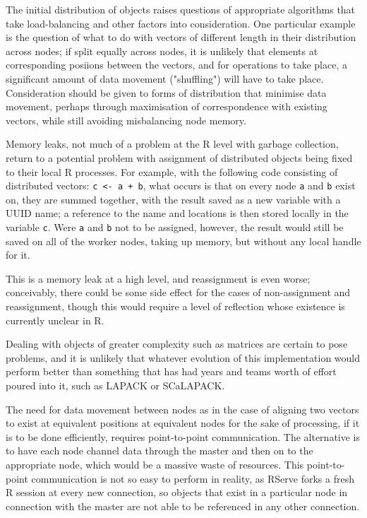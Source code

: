\documentclass[a4paper,10pt]{article}
\begin{document}
The initial distribution of objects raises questions of appropriate algorithms
that take load-balancing and other factors into consideration.
One particular example is the question of what to do with vectors of different
length in their distribution across nodes;
if split equally across nodes, it is unlikely that elements at corresponding
posiions between the vectors, and for operations to take place, a significant
amount of data movement ("shuffling") will have to take place.
Consideration should be given to forms of distribution that minimise data
movement, perhaps through maximisation of correspondence with existing vectors,
while still avoiding misbalancing node memory.

Memory leaks, not much of a problem at the R level with garbage collection,
return to a potential problem with assignment of distributed objects being
fixed to their local R processes.
For example, with the following code consisting of distributed vectors: \texttt{c <- a
+ b}, what occurs is that on every node \texttt{a} and \texttt{b} exist on, they are summed
together, with the result saved as a new variable with a UUID name; a reference
to the name and locations is then stored locally in the variable \texttt{c}.
Were \texttt{a} and \texttt{b} not to be assigned, however, the result would still be saved
on all of the worker nodes, taking up memory, but without any local handle for
it.

This is a memory leak at a high level, and reassignment is even worse;
conceivably, there could be some side effect for the cases of non-assignment
and reassignment, though this would require a level of reflection whose
existence is currently unclear in R.

Dealing with objects of greater complexity such as matrices are certain to pose
problems, and it is unlikely that whatever evolution of this implementation
would perform better than something that has had years and teams worth of
effort poured into it, such as LAPACK or SCaLAPACK.

The need for data movement between nodes as in the case of aligning two vectors
to exist at equivalent positions at equivalent nodes for the sake of
processing, if it is to be done efficiently, requires point-to-point
communication.
The alternative is to have each node channel data through the master and then
on to the appropriate node, which would be a massive waste of resources.
This point-to-point communication is not so easy to perform in reality, as
RServe forks a fresh R session at every new connection, so objects that exist
in a particular node in connection with the master are not able to be
referenced in any other connection.
\end{document}
